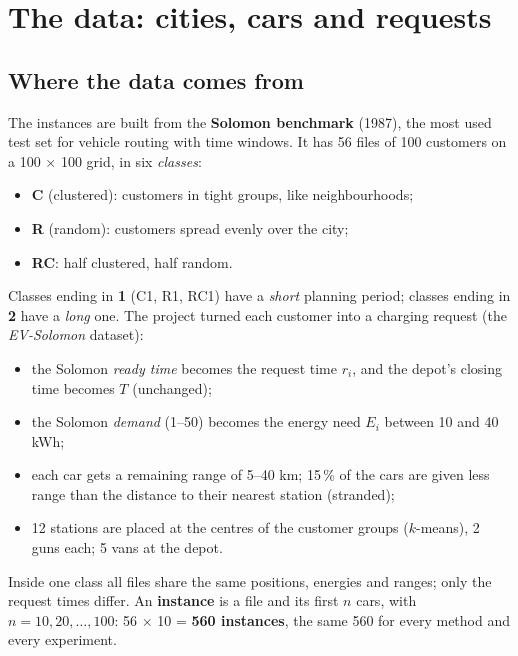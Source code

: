 \section{The data: cities, cars and requests}
\label{sec:data}

\subsection{Where the data comes from}

The instances are built from the \textbf{Solomon benchmark} (1987), the most used test set for vehicle routing with time windows. It has 56 files of 100 customers on a 100 $\times$ 100 grid, in six \emph{classes}:
\begin{itemize}
  \item \textbf{C} (clustered): customers in tight groups, like neighbourhoods;
  \item \textbf{R} (random): customers spread evenly over the city;
  \item \textbf{RC}: half clustered, half random.
\end{itemize}
Classes ending in \textbf{1} (C1, R1, RC1) have a \emph{short} planning period; classes ending in \textbf{2} have a \emph{long} one. The project turned each customer into a charging request (the \emph{EV-Solomon} dataset):
\begin{itemize}
  \item the Solomon \emph{ready time} becomes the request time $r_i$, and the depot's closing time becomes $T$ (unchanged);
  \item the Solomon \emph{demand} (1--50) becomes the energy need $E_i$ between 10 and 40 kWh;
  \item each car gets a remaining range of 5--40 km; 15\,\% of the cars are given less range than the distance to their nearest station (stranded);
  \item 12 stations are placed at the centres of the customer groups ($k$-means), 2 guns each; 5 vans at the depot.
\end{itemize}
Inside one class all files share the same positions, energies and ranges; only the request times differ. An \textbf{instance} is a file and its first $n$ cars, with $n=10,20,\dots,100$: 56 $\times$ 10 = \textbf{560 instances}, the same 560 for every method and every experiment.

\begin{table}[H]
\centering
\caption{The six Solomon classes as used here (one row per class; the EV attributes are those of the 100 cars of the class).}

\end{table}


